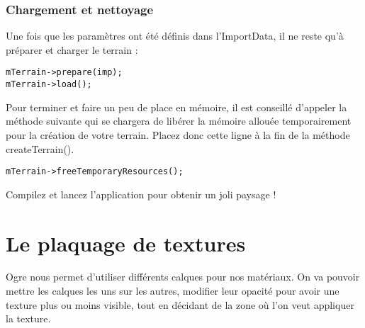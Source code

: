 \subsubsection{Chargement et nettoyage}


Une fois que les param\`etres ont \'et\'e d\'efinis dans l'ImportData, il ne reste qu'\`a pr\'eparer et charger le terrain :

\begin{lstlisting}[caption={Pr\'eparation et chargement du terrain}]
mTerrain->prepare(imp);
mTerrain->load();
\end{lstlisting}

Pour terminer et faire un peu de place en m\'emoire, il est conseill\'e d'appeler la m\'ethode suivante qui se chargera de lib\'erer la m\'emoire allou\'ee temporairement pour la cr\'eation de votre terrain. Placez donc cette ligne \`a la fin de la m\'ethode createTerrain().

\begin{lstlisting}[caption={Lib\'eration de place en m\'emoire}]
mTerrain->freeTemporaryResources();
\end{lstlisting}

Compilez et lancez l'application pour obtenir un joli paysage !


































\section{Le plaquage de textures}


Ogre nous permet d'utiliser diff\'erents calques pour nos mat\'eriaux. On va pouvoir mettre les calques les uns sur les autres, modifier leur opacit\'e pour avoir une texture plus ou moins visible, tout en d\'ecidant de la zone o\`u l'on veut appliquer la texture.

